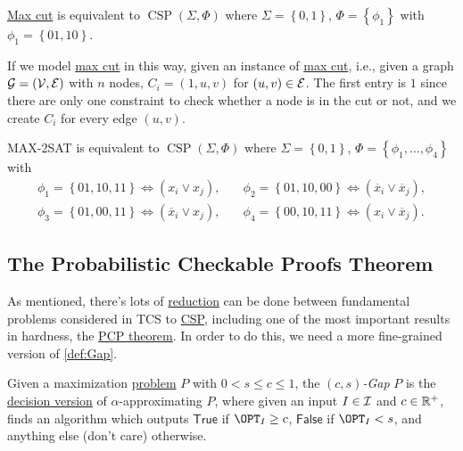 \begin{eg}
	\hyperref[prb:max-cut]{Max cut} is equivalent to \(\mathop{\mathrm{CSP}}(\Sigma , \Phi )\) where \(\Sigma = \left\{ 0, 1 \right\} \), \(\Phi = \left\{ \phi _1 \right\} \) with \(\phi _1 = \left\{ 01, 10 \right\}\).
\end{eg}
\begin{explanation}
	If we model \hyperref[prb:max-cut]{max cut} in this way, given an instance of \hyperref[prb:max-cut]{max cut}, i.e., given a graph \(\mathcal{\MakeUppercase{g}} =(\mathcal{\MakeUppercase{v}} , \mathcal{\MakeUppercase{e}} )\) with \(n\) nodes, \(C_i = (1, u, v)\) for \((u, v)\in \mathcal{\MakeUppercase{e}} \). The first entry is \(1\) since there are only one constraint to check whether a node is in the cut or not, and we create \(C_i\) for every edge \((u, v)\).
\end{explanation}

\begin{eg}
	MAX-2SAT is equivalent to \(\mathop{\mathrm{CSP}}(\Sigma , \Phi )\) where \(\Sigma = \left\{ 0, 1 \right\} \), \(\Phi =\left\{ \phi _1, \ldots , \phi _4  \right\} \) with
	\[
		\begin{split}
			\phi _1 = \left\{ 01, 10, 11 \right\} \iff (x_i \lor x_j), &\quad
			\phi _2 = \left\{ 01, 10, 00 \right\} \iff (\overline{x}_i \lor \overline{x}_j),\\
			\phi _3 = \left\{ 01, 00, 11 \right\} \iff (\overline{x}_i \lor x_j), &\quad
			\phi _4 = \left\{ 00, 10, 11 \right\} \iff (x_i \lor \overline{x}_j).
		\end{split}
	\]
\end{eg}
\subsection{The Probabilistic Checkable Proofs Theorem}
As mentioned, there's lots of \hyperref[def:reduction]{reduction} can be done between fundamental problems considered in TCS to \hyperref[prb:CSP]{CSP}, including one of the most important results in hardness, the \hyperref[thm:PCP]{PCP theorem}. In order to do this, we need a more fine-grained version of \autoref{def:Gap}.

\begin{definition}[\((c, s)\)-Gap]\label{def:c-s-Gap}
	Given a maximization \hyperref[def:combinatorial-optimization]{problem} \(P\) with \(0 < s \leq c \leq 1\), the \emph{\((c, s)\)-Gap} \(P\) is the \hyperref[def:decision-P]{decision version} of \(\alpha\)-approximating \(P\), where given an input \(I\in \mathcal{\MakeUppercase{i}} \) and \(c\in \mathbb{\MakeUppercase{r}} ^+\), finds an algorithm which outputs \(\textsf{True}\) if \(\OPT_I \geq c\), \(\textsf{False}\) if \(\OPT_I < s\), and anything else (don't care) otherwise.
\end{definition}

